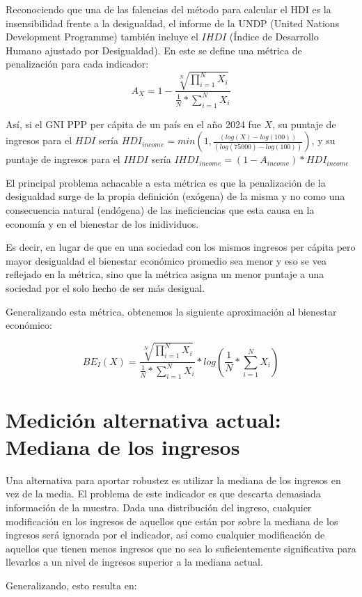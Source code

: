 Reconociendo que una de las falencias del método para calcular el HDI es la insensibilidad frente a la desigualdad, el informe de la UNDP (United Nations Development Programme) también incluye el $IHDI$ (Índice de Desarrollo Humano ajustado por Desigualdad). En este se define una métrica de penalización para cada indicador:
$$
    A_X = 1 - \frac{\sqrt[N]{\prod_{i=1}^NX_i}}{\frac{1}{N} * \sum_{i=1}^N X_i}
$$

Así, si el GNI PPP per cápita de un país en el año 2024 fue $X$, su puntaje de ingresos para el $HDI$ sería $ HDI_{income} = min(1, \frac{(log(X)-log(100))}{(log(75000)-log(100))})$, y su puntaje de ingresos para el $IHDI$ sería $IHDI_{income} = (1-A_{income}) * HDI_{income}$

El principal problema achacable a esta métrica es que la penalización de la desigualdad surge de la propia definición (exógena) de la misma y no como una consecuencia natural (endógena) de las ineficiencias que esta causa en la economía y en el bienestar de los inidividuos. 

Es decir, en lugar de que en una sociedad con los mismos ingresos per cápita pero mayor desigualdad el bienestar económico promedio sea menor y eso se vea reflejado en la métrica, sino que la métrica asigna un menor puntaje a una sociedad por el solo hecho de ser más desigual.

Generalizando esta métrica, obtenemos la siguiente aproximación al bienestar económico:

$$
    BE_I(X) = \frac{\sqrt[N]{\prod_{i=1}^NX_i}}{\frac{1}{N} * \sum_{i=1}^N X_i} * log(\frac{1}{N} * \sum_{i=1}^{N}X_i)
$$



\section{Medición alternativa actual: Mediana de los ingresos}

Una alternativa para aportar robustez es utilizar la mediana de los ingresos en vez de la media. El problema de este indicador es que descarta demasiada información de la muestra. Dada una distribución del ingreso, cualquier modificación en los ingresos de aquellos que están por sobre la mediana de los ingresos será ignorada por el indicador, así como cualquier modificación de aquellos que tienen menos ingresos que no sea lo suficientemente significativa para llevarlos a un nivel de ingresos superior a la mediana actual.

Generalizando, esto resulta en:

